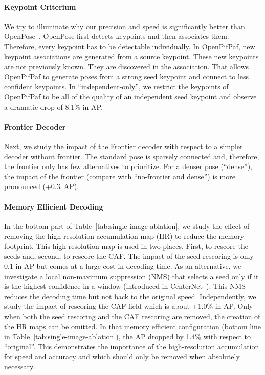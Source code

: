 \documentclass[journal]{IEEEtran}
\begin{document}
\paragraph{Keypoint Criterium}
We try to illuminate why our precision and speed is significantly better than
OpenPose~\cite{cao2017realtime}. OpenPose first detects keypoints and then
associates them. Therefore, every keypoint has to be detectable individually.
In OpenPifPaf, new keypoint associations are generated from a source keypoint.
These new keypoints are not previously known. They are discovered in the
association. That allows OpenPifPaf to generate poses from a strong seed
keypoint and connect to less confident keypoints. In ``independent-only'',
we restrict the keypoints of OpenPifPaf to be all of the quality of
an independent seed keypoint and observe a dramatic drop of 8.1\% in AP.

\paragraph{Frontier Decoder}
Next, we study the impact
of the Frontier decoder with respect to a simpler decoder without frontier.
The standard pose is sparsely connected and, therefore, the frontier only
has few alternatives to prioritize. For a denser pose (``dense''), the
impact of the frontier (compare with ``no-frontier and dense'') is more
pronounced (+0.3~AP).

\paragraph{Memory Efficient Decoding}
In the bottom part of Table~\ref{tab:single-image-ablation}, we study
the effect of removing the high-resolution accumulation map (HR)
to reduce the memory footprint.
This high resolution map is used in two places. First, to rescore the seeds
and, second, to rescore the CAF. The impact of the seed rescoring
is only 0.1 in AP but comes at a large cost in decoding time.
As an alternative, we investigate a local non-maximum suppression (NMS)
that selects a seed only if it is the highest confidence in a 
window (introduced in CenterNet~\cite{zhou2019objects}). This NMS reduces
the decoding time but not back to the original speed.
Independently, we study the
impact of rescoring the CAF field which is about +1.0\% in AP. Only
when both the seed rescoring and the CAF rescoring are removed, the
creation of the HR maps can be omitted. In that memory efficient
configuration (bottom line in Table~\ref{tab:single-image-ablation}),
the AP dropped by 1.4\% with respect to ``original''. This demonstrates
the importance of the high-resolution accumulation for speed and accuracy
and which should only be removed when absolutely necessary.
\end{document}
